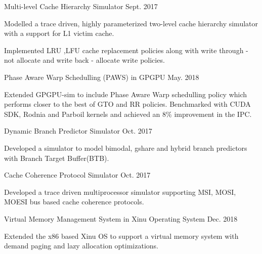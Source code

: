 \begin{cvprojects}
     \cvproject
    {Multi-level Cache Hierarchy Simulator }
    {\color{darkgray}Sept. 2017}
    {
      \begin{cvprojectitems}
        \item {Modelled a trace driven, highly parameterized two-level cache hierarchy simulator with a support for L1 victim cache. }
        \item {Implemented LRU ,LFU cache replacement policies along with write through - not allocate and write back - allocate write policies.} 
      \end{cvprojectitems}
    }

    \cvproject
    {Phase Aware Warp Schedulling (PAWS) in GPGPU }
    {\color{darkgray}May. 2018}
    {
      \begin{cvprojectitems}
        \item {Extended GPGPU-sim to include Phase Aware Warp schedulling policy which performs closer to the best of GTO and RR policies. Benchmarked with CUDA SDK, Rodnia and Parboil kernels and achieved an 8\% improvement in the IPC.} 
      \end{cvprojectitems}
    }

    \cvproject
    {Dynamic Branch Predictor Simulator }
    {\color{darkgray}Oct. 2017}
    {
      \begin{cvprojectitems1}
        \item {Developed a simulator to model bimodal, gshare and hybrid branch predictors with Branch Target Buffer(BTB). }
      \end{cvprojectitems1}
    }
    \par\addvspace{-1ex}
     \cvproject
    {Cache Coherence Protocol Simulator }
    {\color{darkgray}Oct. 2017}
    { \begin{cvprojectitems1}
        \item {Developed a trace driven multiprocessor simulator supporting MSI, MOSI, MOESI bus based cache coherence protocols.} %
      \end{cvprojectitems1}
    }
    \par\addvspace{-1ex}
    \cvproject
    {Virtual Memory Management System in Xinu Operating System }
    {\color{darkgray}Dec. 2018}
    {
      \begin{cvprojectitems1}
        \item {Extended the x86 based Xinu OS to support a virtual memory system with demand paging and lazy allocation optimizations. }
      \end{cvprojectitems1}
    }

\end{cvprojects}
